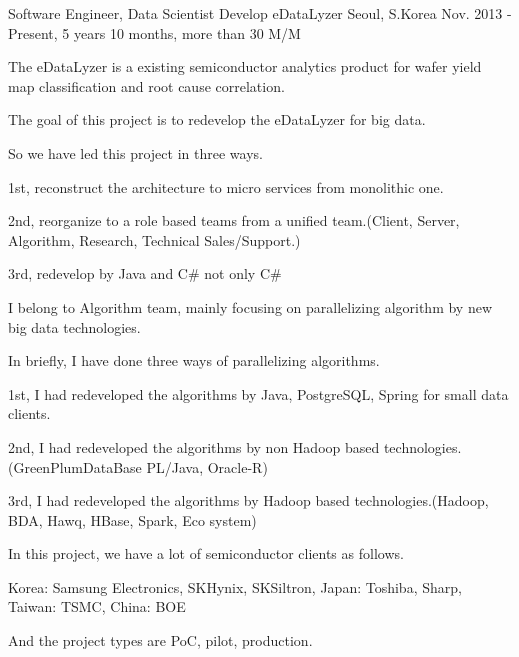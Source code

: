 

\begin{cventries}

  \cventry
    {Software Engineer, Data Scientist} %
    {Develop eDataLyzer} %
    {Seoul, S.Korea} %
    {Nov. 2013 - Present, 5 years 10 months, more than 30 M/M} %
    {
      \begin{cvitems} %
        \item {The eDataLyzer is a existing semiconductor analytics product for wafer yield map classification and root cause correlation.}
        \item {The goal of this project is to redevelop the eDataLyzer for big data.}
        \item {So we have led this project in three ways.}
        \item {1st, reconstruct the architecture to micro services from monolithic one.}
        \item {2nd, reorganize to a role based teams from a unified team.(Client, Server, Algorithm, Research, Technical Sales/Support.)}
        \item {3rd, redevelop by Java and C\# not only C\#}
        \item {I belong to Algorithm team, mainly focusing on parallelizing algorithm by new big data technologies.}
        \item {In briefly, I have done three ways of parallelizing algorithms.}
        \item {1st, I had redeveloped the algorithms by Java, PostgreSQL, Spring for small data clients.}
        \item {2nd, I had redeveloped the algorithms by non Hadoop based technologies.(GreenPlumDataBase PL/Java, Oracle-R)}
        \item {3rd, I had redeveloped the algorithms by Hadoop based technologies.(Hadoop, BDA, Hawq, HBase, Spark, Eco system)}
        \item {In this project, we have a lot of semiconductor clients as follows.}
        \item {Korea: Samsung Electronics, SKHynix, SKSiltron, Japan: Toshiba, Sharp, Taiwan: TSMC, China: BOE}
        \item {And the project types are PoC, pilot, production.}
      \end{cvitems}
    }


\end{cventries}
